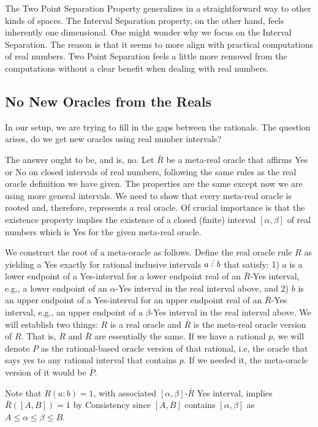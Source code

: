 \documentclass[12pt]{article}
\begin{document}
The Two Point Separation Property generalizes in a straightforward way to other kinds of spaces. The Interval Separation property, on the other hand, feels inherently one dimensional. One might wonder why we focus on the Interval Separation. The reason is that it seems to more align with practical computations of real numbers. Two Point Separation feels a little more removed from the computations without a clear benefit when dealing with real numbers. 


\subsection{No New Oracles from the Reals}

In our setup, we are trying to fill in the gaps between the rationals. The question arises, do we get new oracles using real number intervals? 

The answer ought to be, and is, no. Let $\bar{R}$ be a meta-real oracle that affirms Yes or No on closed intervals of real numbers, following the same rules as the real oracle definition we have given. The properties are the same except now we are using more general intervals. We need to show that every meta-real oracle is rooted and, therefore, represents a real oracle. Of crucial importance is that the existence property implies the existence of a closed (finite) interval $[\alpha, \beta]$ of real numbers which is Yes for the given meta-real oracle. 

We construct the root of a meta-oracle as follows. Define the real oracle rule $R$ as yielding a Yes exactly for rational inclusive intervals $a\lte b$ that satisfy: 1) $a$ is a lower endpoint of a Yes-interval for a lower endpoint real of an $\bar{R}$-Yes interval, e.g., a lower endpoint of an $\alpha$-Yes interval in the real interval above,  and 2) $b$ is an upper endpoint of a Yes-interval for an upper endpoint real of an $\bar{R}$-Yes interval, e.g., an upper endpoint of a $\beta$-Yes interval in the real interval above. We will establish two things: $R$ is a real oracle and $\bar{R}$ is the meta-real oracle version of $R$. That is, $R$ and $\bar{R}$ are essentially the same. If we have a rational $p$, we will denote $P$ as the rational-based oracle version of that rational, i.e, the oracle that says yes to any rational interval that contains $p$. If we needed it, the meta-oracle version of it would be $\bar{P}$. 

Note that $R(a:b) = 1$, with associated $[\alpha, \beta]$-$\bar{R}$ Yes interval, implies $\bar{R}([A, B]) = 1$ by Consistency since $[A, B]$ contains $[\alpha, \beta]$ as $A \leq \alpha \leq \beta \leq B$.
\end{document}

